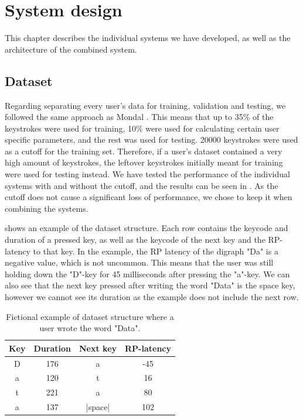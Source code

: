 \chapter{System design}
\label{chap:proposed}

This chapter describes the individual systems we have developed, as well as the architecture of the combined system. 


\section{Dataset}
\label{sec:system-design-dataset}
Regarding separating every user's data for training, validation and testing, we followed the same approach as Mondal \cite{mondal}. 
This means that up to 35\% of the keystrokes were used for training, 10\% were used for calculating certain user specific parameters, and the rest was used for testing.
20000 keystrokes were used as a cutoff for the training set.
Therefore, if a user's dataset contained a very high amount of keystrokes, the leftover keystrokes initially meant for training were used for testing instead.
We have tested the performance of the individual systems with and without the cutoff, and the results can be seen in .
As the cutoff does not cause a significant loss of performance, we chose to keep it when combining the systems.

 shows an example of the dataset structure.
Each row contains the keycode and duration of a pressed key, as well as the keycode of the next key and the RP-latency to that key.
In the example, the RP latency of the digraph "Da" is a negative value, which is not uncommon.
This means that the user was still holding down the "D"-key for 45 milliseconds after pressing the "a"-key.
We can also see that the next key pressed after writing the word "Data" is the space key, however we cannot see its duration as the example does not include the next row.

\begin{table}[h]
\centering
\begin{tabular}{cccc}
\hline
Key & Duration & Next key & RP-latency \\ \hline
D   & 176      & a        & -45\\
a   & 120      & t        & 16 \\
t   & 221      & a        & 80 \\ 
a   & 137      & |space|  & 102\\ \hline
\end{tabular}
\caption{Fictional example of dataset structure where a user wrote the word "Data".}
\label{tab:proposed_dataset_example}
\end{table}


